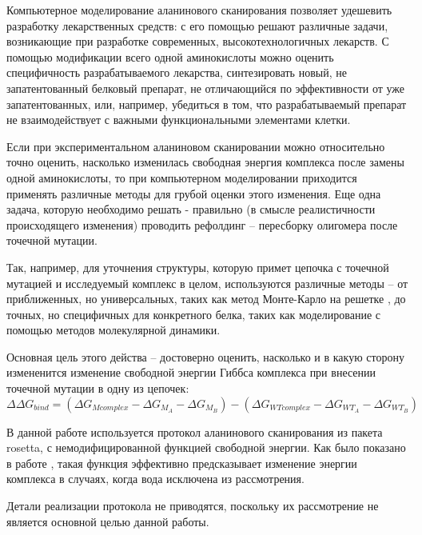 Компьютерное моделирование аланинового сканирования позволяет удешевить разработку лекарственных средств: с его помощью решают различные задачи, возникающие при разработке современных, высокотехнологичных лекарств. С помощью модификации всего одной аминокислоты можно оценить специфичность разрабатываемого лекарства, синтезировать новый, не запатентованный белковый препарат, не отличающийся по эффективности от уже запатентованных, или, например, убедиться в том, что разрабатываемый препарат не взаимодействует с важными функциональными элементами клетки. 


Если при экспериментальном аланиновом сканировании можно относительно точно оценить, насколько изменилась свободная энергия комплекса после замены одной аминокислоты, то при компьютерном моделировании приходится применять различные методы для грубой оценки этого изменения. Еще одна задача, которую необходимо решать - правильно (в смысле реалистичности происходящего изменения) проводить рефолдинг -- пересборку олигомера после точечной мутации.

Так, например, для уточнения структуры, которую примет цепочка с точечной мутацией и исследуемый комплекс в целом, используются различные методы -- от приближенных, но универсальных, таких как метод Монте-Карло на решетке \cite{monte_carlo}, до точных, но специфичных для конкретного белка, таких как моделирование с помощью методов молекулярной динамики.

Основная цель этого действа -- достоверно оценить, насколько и в какую сторону измененится изменение свободной энергии Гиббса \ddG комплекса при внесении точечной мутации в одну из цепочек:
$$
\Delta\Delta G_{bind} = (\Delta G_{M complex} - \Delta G_{M_A} - \Delta G_{M_B}) - (\Delta G_{WT complex} - \Delta G_{WT_A} - \Delta G_{WT_B})
$$

В данной работе используется протокол аланинового сканирования из пакета rosetta, с немодифицированной функцией свободной энергии. Как было показано в работе \cite{kortemme2002}, такая функция  эффективно предсказывает изменение энергии комплекса в случаях, когда вода исключена из рассмотрения.

Детали реализации протокола не приводятся, поскольку их рассмотрение не является основной целью данной работы.





